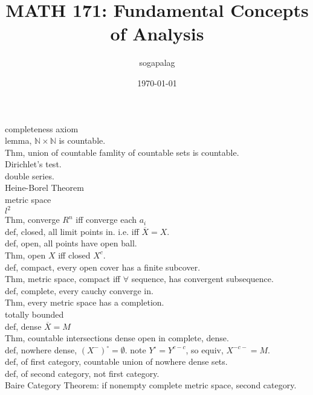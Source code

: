 \documentclass[paper=a4, fontsize=11pt]{scrartcl} %
\title{MATH 171: Fundamental Concepts of Analysis}
\author{sogapalag}
\date{\normalsize\today}
\numberwithin{equation}{section} %
\numberwithin{figure}{section} %
\numberwithin{table}{section} %
\begin{document}
\maketitle
completeness axiom\\
lemma, $\mathbb{N}\times \mathbb{N}$ is countable.\\
Thm, union of countable famlity of countable sets is countable.\\
Dirichlet's test.\\
double series.\\
Heine-Borel Theorem\\
metric space\\
$l^2$\\
Thm, converge $R^n$ iff converge each $a_i$\\
def, closed, all limit points in. i.e. iff $\overline{X}= X$.\\
def, open, all points have open ball.\\
Thm, open $X$ iff closed $X^c$.\\
def, compact, every open cover has a finite subcover.\\
Thm, metric space, compact iff $\forall$ sequence, has convergent subsequence.\\
def, complete, every cauchy converge in.\\
Thm, every metric space has a completion.\\
totally bounded\\
def, dense $\overline{X}=M$\\
Thm, countable intersections dense open in complete, dense.\\
def, nowhere dense, $(X^-)^\circ=\emptyset$. note $Y^{\circ}=Y^{c-c}$, so equiv, $X^{-c-}=M$.\\
def, of first category, countable union of nowhere dense sets.\\
def, of second category, not first category.\\
Baire Category Theorem: if nonempty complete metric space, second category.\\
\end{document}
